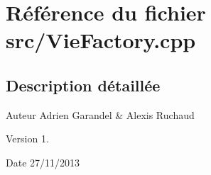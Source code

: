 \section{Référence du fichier src/\-Vie\-Factory.cpp}
\label{_vie_factory_8cpp}


\subsection{Description détaillée}
\begin{DoxyAuthor}{Auteur}
Adrien Garandel \& Alexis Ruchaud 
\end{DoxyAuthor}
\begin{DoxyVersion}{Version}
1. 
\end{DoxyVersion}
\begin{DoxyDate}{Date}
27/11/2013 
\end{DoxyDate}
